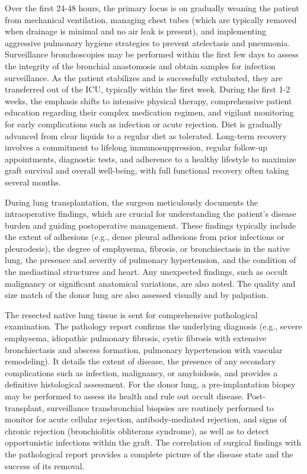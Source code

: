 Over the first 24-48 hours, the primary focus is on gradually weaning the patient from mechanical ventilation, managing chest tubes (which are typically removed when drainage is minimal and no air leak is present), and implementing aggressive pulmonary hygiene strategies to prevent atelectasis and pneumonia. Surveillance bronchoscopies may be performed within the first few days to assess the integrity of the bronchial anastomosis and obtain samples for infection surveillance. As the patient stabilizes and is successfully extubated, they are transferred out of the ICU, typically within the first week. During the first 1-2 weeks, the emphasis shifts to intensive physical therapy, comprehensive patient education regarding their complex medication regimen, and vigilant monitoring for early complications such as infection or acute rejection. Diet is gradually advanced from clear liquids to a regular diet as tolerated. Long-term recovery involves a commitment to lifelong immunosuppression, regular follow-up appointments, diagnostic tests, and adherence to a healthy lifestyle to maximize graft survival and overall well-being, with full functional recovery often taking several months.

During lung transplantation, the surgeon meticulously documents the intraoperative findings, which are crucial for understanding the patient's disease burden and guiding postoperative management. These findings typically include the extent of adhesions (e.g., dense pleural adhesions from prior infections or pleurodesis), the degree of emphysema, fibrosis, or bronchiectasis in the native lung, the presence and severity of pulmonary hypertension, and the condition of the mediastinal structures and heart. Any unexpected findings, such as occult malignancy or significant anatomical variations, are also noted. The quality and size match of the donor lung are also assessed visually and by palpation.

The resected native lung tissue is sent for comprehensive pathological examination. The pathology report confirms the underlying diagnosis (e.g., severe emphysema, idiopathic pulmonary fibrosis, cystic fibrosis with extensive bronchiectasis and abscess formation, pulmonary hypertension with vascular remodeling). It details the extent of disease, the presence of any secondary complications such as infection, malignancy, or amyloidosis, and provides a definitive histological assessment. For the donor lung, a pre-implantation biopsy may be performed to assess its health and rule out occult disease. Post-transplant, surveillance transbronchial biopsies are routinely performed to monitor for acute cellular rejection, antibody-mediated rejection, and signs of chronic rejection (bronchiolitis obliterans syndrome), as well as to detect opportunistic infections within the graft. The correlation of surgical findings with the pathological report provides a complete picture of the disease state and the success of its removal.

